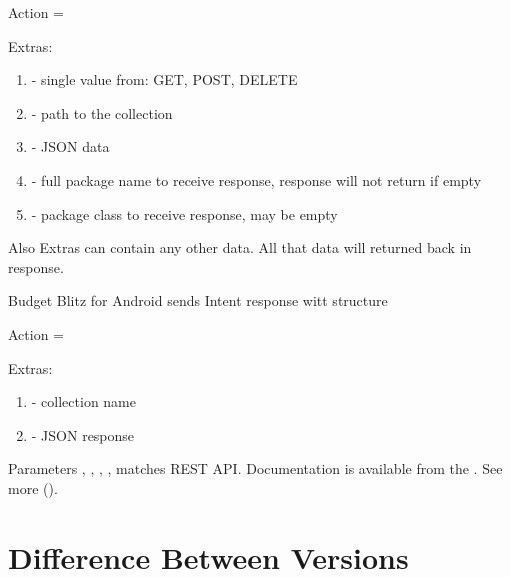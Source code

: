 \documentclass[a4paper,10pt,english]{sphinxmanual}
\begin{document}
Action = 

Extras:
\begin{enumerate}
\def\theenumi{\arabic{enumi}}
\def\labelenumi{\theenumi .}
\makeatletter\def\p@enumii{\p@enumi \theenumi .}\makeatother
\item {} 
 - single value from: GET, POST, DELETE

\item {} 
 - path to the collection

\item {} 
 - JSON data

\item {} 
 - full package name to receive response, response will not return if empty

\item {} 
 - package class to receive response, may be empty

\end{enumerate}

Also Extras can contain any other data. All that data will returned back in response.

Budget Blitz for Android sends Intent response witt structure

Action = 

Extras:
\begin{enumerate}
\def\theenumi{\arabic{enumi}}
\def\labelenumi{\theenumi .}
\makeatletter\def\p@enumii{\p@enumi \theenumi .}\makeatother
\item {} 
 - collection name

\item {} 
 - JSON response

\end{enumerate}

Parameters , , , ,  matches REST API. Documentation is available from the .
See more {\hyperref[\detokenize{api:sub-chapter-rest-api}]{}} ().


\chapter{Difference Between Versions}
\label{\detokenize{versions:difference-between-versions}}\label{\detokenize{versions:chapter-versions}}\label{\detokenize{versions::doc}}
\end{document}
